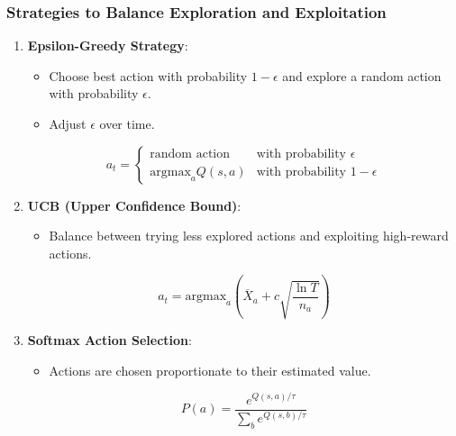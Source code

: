 \documentclass[aspectratio=169]{beamer}
\begin{document}
\begin{frame}[fragile]
    \frametitle{Strategies to Balance Exploration and Exploitation}
    \begin{enumerate}
        \item \textbf{Epsilon-Greedy Strategy}:
        \begin{itemize}
            \item Choose best action with probability \(1 - \epsilon\) and explore a random action with probability \(\epsilon\).
            \item Adjust \(\epsilon\) over time.
        \end{itemize}
        \begin{equation}
            a_t = 
            \begin{cases} 
            \text{random action} & \text{with probability } \epsilon \\ 
            \text{argmax}_a Q(s, a) & \text{with probability } 1 - \epsilon 
            \end{cases}
        \end{equation}

        \item \textbf{UCB (Upper Confidence Bound)}:
        \begin{itemize}
            \item Balance between trying less explored actions and exploiting high-reward actions.
        \end{itemize}
        \begin{equation}
            a_t = \text{argmax}_a \left( 
            \overline{X}_a + c \sqrt{\frac{\ln T}{n_a}} 
            \right)
        \end{equation}
        
        \item \textbf{Softmax Action Selection}:
        \begin{itemize}
            \item Actions are chosen proportionate to their estimated value.
        \end{itemize}
        \begin{equation}
            P(a) = \frac{e^{Q(s,a)/\tau}}{\sum_{b} e^{Q(s,b)/\tau}}
        \end{equation}
    \end{enumerate}
\end{frame}
\end{document}

